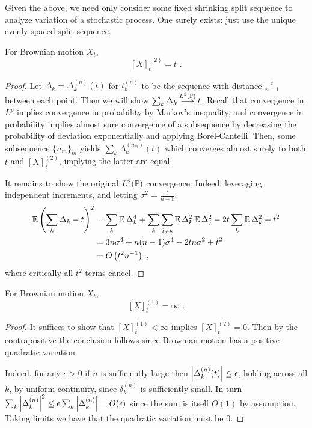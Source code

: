 \documentclass{article}
\begin{document}
       Given the above, we need only consider some fixed shrinking split sequence to analyze variation of a stochastic process. One surely exists: just use the unique evenly spaced split sequence.

         \begin{theorem}
           For Brownian motion \(X_t\),
           \[[X]_t^{(2)}=t\,\,.\]
         \end{theorem}
         \begin{proof}
           Let \(\Delta_k=\Delta_k^{(n)}(t)\) for \(t_k^{(n)}\) to be the sequence with distance \(\frac{t}{n-1}\) between each point. Then we will show \(\sum_k\Delta_k\mathbin{\overset{L^2\pa{\P}}{\longrightarrow}} t\). Recall that convergence in \(L^{p}\) implies convergence in probability by Markov's inequality, and convergence in probability implies almost sure convergence of a subsequence by decreasing the probability of deviation exponentially and applying Borel-Cantelli. Then, some subsequence \(\{n_m\}_m\) yields \(\sum_k\Delta^{(n_m)}_k(t)\) which converges almost surely to both \(t\) and \([X]_t^{(2)}\), implying the latter are equal.

           It remains to show the original \(L^2(\P)\) convergence. Indeed, leveraging independent increments, and letting \(\sigma^2=\frac{t}{n-1}\),
           \begin{align*}
             \E\pa{\sum_k\Delta_k-t}^2&=\sum_k\E\Delta_k^4+\sum_k\sum_{j\neq k}\E\Delta_k^2\E\Delta_j^2-2t\sum_k\E\Delta_k^2+t^2\\
                                      &=3n\sigma^4+n(n-1)\sigma^4-2tn\sigma^2+t^2\\
             &= O\pa{t^2n^{-1}}\,\,,
           \end{align*}
           where critically all \(t^2\) terms cancel.
         \end{proof}

         \begin{theorem}
           For Brownian motion \(X_t\),
           \[[X]_t^{(1)}=\infty\,\,.\]
         \end{theorem}
         \begin{proof}
           It suffices to show that \([X]_t^{(1)}<\infty\) implies \([X]_t^{(2)}=0\). Then by the contrapositive the conclusion follows since Brownian motion has a positive quadratic variation.

           Indeed, for any \(\epsilon>0\) if \(n\) is sufficiently large then \(\abs{\Delta_k^{(n)}(t)}\le\epsilon\), holding across all \(k\), by uniform continuity, since \(\delta_k^{(n)}\) is sufficiently small. In turn \(\sum_k\abs{\Delta_k^{(n)}}^2\le\epsilon\sum_k\abs{\Delta_k^{(n)}}=O(\epsilon)\) since the sum is itself \(O(1)\) by assumption. Taking limits we have that the quadratic variation must be \(0\).           
\end{proof}
\end{document}
